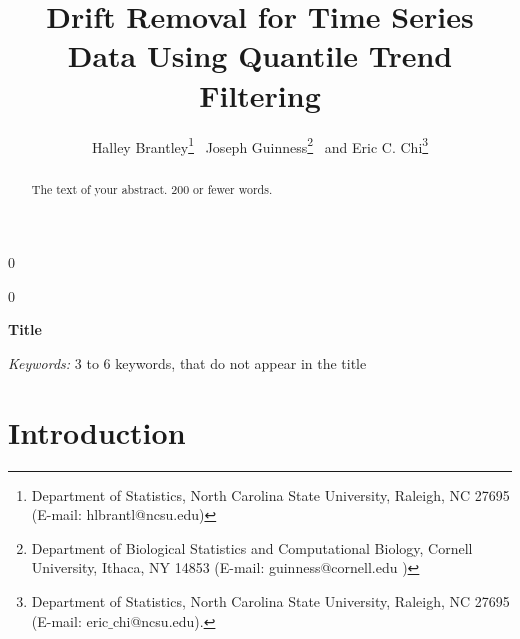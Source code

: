 \documentclass[12pt]{article}
\newcommand{\blind}{0}
\begin{document}
	
	
	\def\spacingset#1{\renewcommand{\baselinestretch}%
		{#1}\small\normalsize} \spacingset{1}
	
	
	
	\blind
	{
		\title{\bf Drift Removal for Time Series Data Using Quantile Trend Filtering}
		\author{Halley Brantley\thanks{
				Department of Statistics, North Carolina State University, Raleigh, NC 27695 (E-mail: hlbrantl@ncsu.edu)} \,
			Joseph Guinness\thanks{
				Department of Biological Statistics and Computational Biology, Cornell University, Ithaca, NY 14853 (E-mail: guinness@cornell.edu )} \,
			and
			Eric C. Chi\thanks{Department of Statistics, North Carolina State University, Raleigh, NC 27695 (E-mail: eric$\_$chi@ncsu.edu).}    \\}
		\date{}
		\maketitle
	} \fi
		
	\blind
	{
		\bigskip
		\bigskip
		\bigskip
		\begin{center}
			{\LARGE\bf Title}
		\end{center}
		\medskip
	} \fi
	
	\bigskip
	\begin{abstract}
		The text of your abstract.  200 or fewer words.
	\end{abstract}
	
	\noindent%
	{\it Keywords:}  3 to 6 keywords, that do not appear in the title
	\vfill
	
	\newpage
	\spacingset{1.5} %
	\section{Introduction}
	\label{sec:intro}
	
\end{document}
